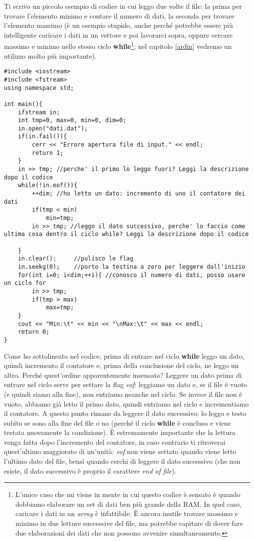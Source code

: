 Ti scrivo un piccolo esempio di codice in cui leggo due volte il file: la prima per trovare l'elemento minimo e contare il numero di dati, la seconda  per trovare l'elemento massimo (è un esempio stupido, anche perché potrebbe essere più intelligente caricare i dati in un vettore e poi lavorarci sopra, oppure cercare massimo e minimo nello stesso ciclo \textbf{while}\footnote{L'unico caso che mi viene in mente in cui questo codice è sensato è quando dobbiamo elaborare un set di dati ben più grande della RAM. In quel caso, caricare i dati in un \emph{array} è infattibile. È ancora inutile trovare massimo e minimo in due letture successive del file, ma potrebbe capitare di dover fare due elaborazioni dei dati che non possono avvenire simultaneamente.}; nel capitolo \ref{ardin} vedremo un utilizzo molto più importante). 
\begin{lstlisting}
#include <iostream>
#include <fstream>
using namespace std;

int main(){
	ifstream in; 
	int tmp=0, max=0, min=0, dim=0;
	in.open("dati.dat");
	if(in.fail()){
		cerr << "Errore apertura file di input." << endl;
		return 1;
	}   
	in >> tmp; //perche' il primo lo leggo fuori? Leggi la descrizione dopo il codice
	while(!in.eof()){
		++dim; //ho letto un dato: incremento di uno il contatore dei dati
		if(tmp < min)
			min=tmp;
		in >> tmp; //leggo il dato successivo, perche' lo faccio come ultima cosa dentro il ciclo while? Leggi la descrizione dopo il codice
		
	}   
	in.clear();     //pulisco le flag
	in.seekg(0);    //porto la testina a zero per leggere dall'inizio       
	for(int i=0; i<dim;++i){ //conosco il numero di dati, posso usare un ciclo for
		in >> tmp;
		if(tmp > max)
			max=tmp;
	}   
	cout << "Min:\t" << min << "\nMax:\t" << max << endl;
	return 0;
}    

\end{lstlisting}
Come ho sottolineato nel codice, prima di entrare nel ciclo \textbf{while} leggo un dato, quindi incremento il contatore e, prima della conclusione del ciclo, ne leggo un altro. Perché quest'ordine apparentemente insensato? Leggere un dato  prima di entrare nel ciclo serve per settare la flag \emph{eof}: leggiamo un dato e, se il file è vuoto (e quindi siamo alla fine), non entriamo neanche nel ciclo. Se invece il file non è vuoto, abbiamo già letto il primo dato, quindi entriamo nel ciclo e incrementiamo il contatore. A questo punto rimane da leggere il dato successivo: lo leggo e testo subito se sono alla fine del file o no (perché il ciclo \textbf{while} è concluso e viene testata nuovamente la condizione). È estremamente importante che la lettura venga fatta dopo l'incremento del contatore, in caso contrario ti ritroverai quest'ultimo maggiorato di un'unità: \emph{eof} non viene settato quando viene letto l'ultimo dato del file, bensì quando cerchi di leggere il dato successivo (che non esiste, il dato successivo è proprio il carattere \emph{end of file}). 


